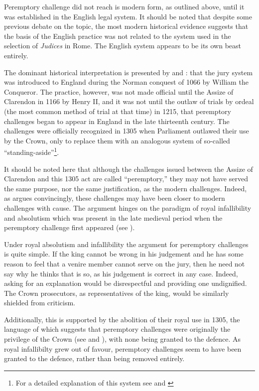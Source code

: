 Peremptory challenge did not reach is modern form, as outlined above, until it was established in the English legal system. It
should be noted that despite some previous debate on the topic, the most modern historical evidence suggests that the basis of the
English practice was not related to the system used in the selection of \textit{Judices} in Rome. The English system appears to be
its own beast entirely.

The dominant historical interpretation is presented by \cite{vonmosch1921} and \cite{hoffman1997}: that the jury system was
introduced to England during the Norman conquest of 1066 by William the Conqueror. The practice, however, was not made official
until the Assize of Clarendon in 1166 by Henry II, and it was not until the outlaw of trials by ordeal (the most common method of
trial at that time) in 1215, that peremptory challenges began to appear in England in the late thirteenth century. The challenges
were officially recognized in 1305 when Parliament outlawed their use by the Crown, only to replace them with an analogous system
of so-called ``standing-aside''\footnote{For a detailed explanation of this system see \cite{hoffman1997} and \cite{brown2000}}. 

It should be noted here that although the challenges issued between the Assize of Clarendon and this 1305 act are called
``peremptory,'' they may not have served the same purpose, nor the same justification, as the modern challenges. Indeed, as
\cite{hoffman1997} argues convincingly, these challenges may have been closer to modern challenges with cause. The argument hinges
on the paradigm of royal infallibility and absolutism which was present in the late medieval period when the peremptory challenge
first appeared (see \cite{burgess1992}).

Under royal absolutism and infallibility the argument for peremptory challenges is quite simple. If the king cannot be wrong in
his judgement and he has some reason to feel that a venire member cannot serve on the jury, then he need not say why he thinks
that is so, as his judgement is correct in any case. Indeed, asking for an explanation would be disrespectful and providing one
undignified. The Crown prosecutors, as representatives of the king, would be similarly shielded from criticism.

Additionally, this is supported by the abolition of their royal use in 1305, the language of which suggests that peremptory
challenges were originally the privilege of the Crown (see \cite{hoffman1997} and \cite{vandykejurysel}), with none being granted
to the defence. As royal infallibilty grew out of favour, peremptory challenges seem to have been granted to the defence, rather
than being removed entirely.

